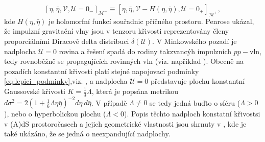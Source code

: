 \begin{equation}
    \label{eq:lepici_podminky}
\left[\eta, \bar{\eta}, \mathcal{V}, \mathcal{U}=0_- \right]_{\mathcal{M}^-} \equiv 
\left[\eta, \bar{\eta}, \mathcal{V}-H\left(\eta, \bar{\eta}\right), \mathcal{U}=0_+  \right]_{\mathcal{M}^+},
\end{equation}
kde $H(\eta, \bar{\eta})$ je holomorfní funkcí souřadnic příčného prostoru. Penrose \cite{Penrose:1972xrn} ukázal, že impulzní gravitační vlny
jsou v tenzoru křivosti reprezentovány členy proporciálními Diracově delta distribuci $\delta(\mathcal{U})$.
V Minkowského pozadí je nadplocha $\mathcal{U}=0$ rovina a řešení spadá do rodiny takzvancýh impulzních $pp-$vln, tedy
rovnoběžně se propagujících rovinných vln (viz. například \cite{griffiths_podolsky_2009}). Obecně na pozadích konstantní křivosti platí stejné napojovací podmínky
\eqref{eq:lepici_podminky},viz. \cite{Podolsky:2014ysa}, a nadplocha $\mathcal{U}=0$ představuje plochu konstantní Gaussovské křivosti 
$K=\frac{1}{3}\Lambda$, která je popsána metrikou $d\sigma^2=2(1+\frac{1}{6}\Lambda \eta \bar{\eta})^{-2} 
d\eta~d\bar{\eta}$. V případě $\Lambda \neq 0$ se tedy jedná buďto o sféru
($\Lambda > 0$), nebo o hyperbolickou plochu ($\Lambda < 0$). Popis těchto nadploch konstatní křivostsi v (A)dS prostoročasech a
jejich geometrické vlastnosti jsou shrnuty v \cite{Podolsky:1997ri}, kde je také ukázáno,
že se jedná o neexpandující nadplochy.


